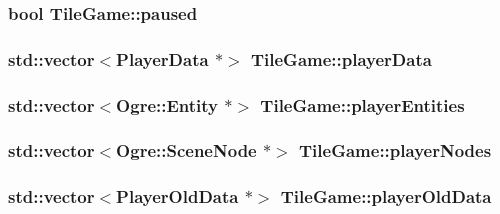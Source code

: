\hypertarget{classTileGame_ac76eb85a5597f84146e49c92f7edc877}{
\subsubsection[{paused}]{\setlength{\rightskip}{0pt plus 5cm}bool Tile\-Game\-::paused\hspace{0.3cm}{\ttfamily [protected]}}}\label{classTileGame_ac76eb85a5597f84146e49c92f7edc877}
\hypertarget{classTileGame_adc02f822e33b2d8a77693301d050bb91}{
\subsubsection[{player\-Data}]{\setlength{\rightskip}{0pt plus 5cm}std\-::vector$<${\bf Player\-Data} $\ast$$>$ Tile\-Game\-::player\-Data\hspace{0.3cm}{\ttfamily [protected]}}}\label{classTileGame_adc02f822e33b2d8a77693301d050bb91}
\hypertarget{classTileGame_a30a9864bb733707d17c15b2c09a6245a}{
\subsubsection[{player\-Entities}]{\setlength{\rightskip}{0pt plus 5cm}std\-::vector$<$Ogre\-::\-Entity $\ast$$>$ Tile\-Game\-::player\-Entities\hspace{0.3cm}{\ttfamily [protected]}}}\label{classTileGame_a30a9864bb733707d17c15b2c09a6245a}
\hypertarget{classTileGame_ab261f06fa3d89f8af2223ffe1a56337a}{
\subsubsection[{player\-Nodes}]{\setlength{\rightskip}{0pt plus 5cm}std\-::vector$<$Ogre\-::\-Scene\-Node $\ast$$>$ Tile\-Game\-::player\-Nodes\hspace{0.3cm}{\ttfamily [protected]}}}\label{classTileGame_ab261f06fa3d89f8af2223ffe1a56337a}
\hypertarget{classTileGame_a0a931a016e78d8aaaa5eb7543565bd31}{
\subsubsection[{player\-Old\-Data}]{\setlength{\rightskip}{0pt plus 5cm}std\-::vector$<${\bf Player\-Old\-Data} $\ast$$>$ Tile\-Game\-::player\-Old\-Data\hspace{0.3cm}{\ttfamily [protected]}}}\label{classTileGame_a0a931a016e78d8aaaa5eb7543565bd31}
